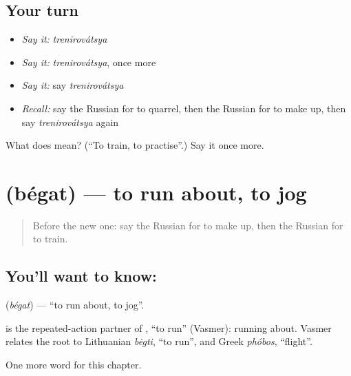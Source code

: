 \subsection*{Your turn}
\begin{itemize}
\raggedright
  \item \emph{Say it:} \emph{trenirovátsya}
  \item \emph{Say it:} \emph{trenirovátsya}, once more
  \item \emph{Say it:} say \emph{trenirovátsya}
  \item \emph{Recall:} say the Russian for to quarrel, then the Russian for to make up, then say \emph{trenirovátsya} again
\end{itemize}

\begin{tcolorbox}[breakable,colback=teal!4,colframe=teal!35!black,title={Before you move on}]
What does  mean? (\textquotedblleft{}To train, to practise\textquotedblright{}.) Say it once more.
\end{tcolorbox}
\section[\texorpdfstring{\ru{бегать} (bégat)}{бегать (bégat)}]{ (bégat) — to run about, to jog}

\label{lesson:RU-C178-begat}



\begin{quote}
Before the new one: say the Russian for to make up, then the Russian for to train.
\end{quote}

\subsection*{You'll want to know: }
\textbf{} (\emph{bégat}) — \textquotedblleft{}to run about, to jog\textquotedblright{}.

\begin{cousinweb}
\textbf{} is the repeated-action partner of \emph{}, \textquotedblleft{}to run\textquotedblright{} (Vasmer): running about. Vasmer relates the root to Lithuanian \emph{bėgti}, \textquotedblleft{}to run\textquotedblright{}, and Greek \emph{phóbos}, \textquotedblleft{}flight\textquotedblright{}.
\end{cousinweb}

\begin{grammarlens}[title={What you've built}]
One more word for this chapter.
\end{grammarlens}

